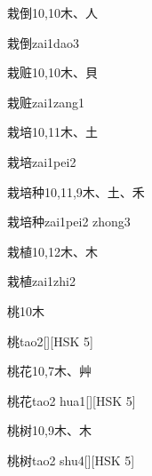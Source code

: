 \begin{Entry}{栽倒}{10,10}{⽊、⼈}
  \begin{Phonetics}{栽倒}{zai1dao3}
  \end{Phonetics}
\end{Entry}

\begin{Entry}{栽赃}{10,10}{⽊、⾙}
  \begin{Phonetics}{栽赃}{zai1zang1}
  \end{Phonetics}
\end{Entry}

\begin{Entry}{栽培}{10,11}{⽊、⼟}
  \begin{Phonetics}{栽培}{zai1pei2}
  \end{Phonetics}
\end{Entry}

\begin{Entry}{栽培种}{10,11,9}{⽊、⼟、⽲}
  \begin{Phonetics}{栽培种}{zai1pei2 zhong3}
  \end{Phonetics}
\end{Entry}

\begin{Entry}{栽植}{10,12}{⽊、⽊}
  \begin{Phonetics}{栽植}{zai1zhi2}
  \end{Phonetics}
\end{Entry}

\begin{Entry}{桃}{10}{⽊}
  \begin{Phonetics}{桃}{tao2}[][HSK 5]
  \end{Phonetics}
\end{Entry}

\begin{Entry}{桃花}{10,7}{⽊、⾋}
  \begin{Phonetics}{桃花}{tao2 hua1}[][HSK 5]
  \end{Phonetics}
\end{Entry}

\begin{Entry}{桃树}{10,9}{⽊、⽊}
  \begin{Phonetics}{桃树}{tao2 shu4}[][HSK 5]
  \end{Phonetics}
\end{Entry}


